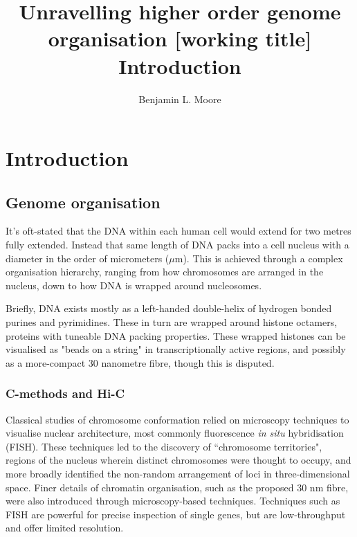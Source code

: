 \documentclass[a4paper,10pt,oneside]{book}
\title{ \vspace{3in} Unravelling higher order genome organisation {\small [working
    title]} \\ \vspace{2em} {\large {\bf Introduction}} }
\author{Benjamin L. Moore}
\begin{document}
\maketitle

\chapter{Introduction}
\section{Genome organisation}

It's oft-stated that the DNA within each human cell would extend for two metres fully extended. Instead that same length of DNA packs into a cell nucleus with a diameter in the order of micrometers ($\mu$m). This is achieved through a complex organisation hierarchy, ranging from how chromosomes are arranged in the nucleus, down to how DNA is wrapped around nucleosomes.\cite{Pombo2015}

Briefly, DNA exists mostly as a left-handed double-helix of hydrogen bonded purines and pyrimidines. These in turn are wrapped around histone octamers, proteins with tuneable DNA packing properties. These wrapped histones can be visualised as "beads on a string" in transcriptionally active regions, and possibly as a more-compact 30 nanometre fibre, though this is disputed.\cite{Naumova2013} %

\subsection{C-methods and Hi-C}

Classical studies of chromosome conformation relied on microscopy techniques to visualise nuclear architecture, most commonly fluorescence \emph{in situ} hybridisation (FISH). These techniques led to the discovery of ``chromosome territories", regions of the nucleus wherein distinct chromosomes were thought to occupy, and more broadly identified the non-random arrangement of loci in three-dimensional space.\cite{DeWit2012, VanSteensel2010} Finer details of chromatin organisation, such as the proposed 30 nm fibre, were also introduced through microscopy-based techniques. Techniques such as FISH are powerful for precise inspection of single genes, but are low-throughput and offer limited resolution.\cite{DeWit2012}
\end{document}
